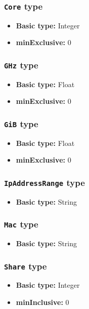 \subsubsection{\texttt{Core} type}

\begin{itemize}
\item \textbf{Basic type:} Integer
	\item \textbf{minExclusive:} 0
\end{itemize}
\subsubsection{\texttt{GHz} type}

\begin{itemize}
\item \textbf{Basic type:} Float
	\item \textbf{minExclusive:} 0
\end{itemize}
\subsubsection{\texttt{GiB} type}

\begin{itemize}
\item \textbf{Basic type:} Float
	\item \textbf{minExclusive:} 0
\end{itemize}
\subsubsection{\texttt{IpAddressRange} type}

\begin{itemize}
\item \textbf{Basic type:} String
\end{itemize}
\subsubsection{\texttt{Mac} type}

\begin{itemize}
\item \textbf{Basic type:} String
\end{itemize}
\subsubsection{\texttt{Share} type}

\begin{itemize}
\item \textbf{Basic type:} Integer
	\item \textbf{minInclusive:} 0
\end{itemize}

